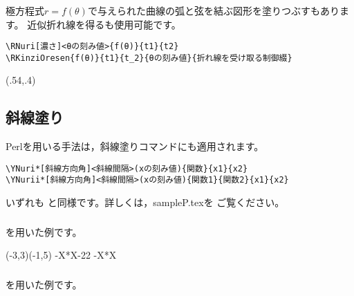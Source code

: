 \subsubsection{}
極方程式$r=f(\theta)$で与えられた曲線の弧と弦を結ぶ図形を塗りつぶすもあります。
近似折れ線を得るも使用可能です。

\begin{boxnote}
\begin{verbatim}
\RNuri[濃さ]<θの刻み値>{f(θ)}{t1}{t2}
\RKinziOresen{f(θ)}{t1}{t_2}{θの刻み値}{折れ線を受け取る制御綴}
\end{verbatim}
\end{boxnote}

\begin{showEx}(.54,.4){}
\end{showEx}
\subsection{斜線塗り}
\textsf{Perl}を用いる手法は，斜線塗りコマンドにも適用されます。

\begin{boxnote}
\begin{verbatim}
\YNuri*[斜線方向角]<斜線間隔>(xの刻み値){関数}{x1}{x2}
\YNurii*[斜線方向角]<斜線間隔>(xの刻み値){関数1}{関数2}{x1}{x2}
\end{verbatim}
\end{boxnote}

いずれも  と同様です。詳しくは，\textsf{sampleP.tex}を
ご覧ください。

\subsubsection{}
を用いた例です。

\begin{showEx}{}
\begin{zahyou}[ul=8mm](-3,3)(-1,5)
  \zahyouMemori[g]
  \def\Fx{4-X*X}
  \YNuri*\Fx{-2}{2}
  \YGurafu*\Fx
\end{zahyou}
\end{showEx}

\subsubsection{}
 を用いた例です。

